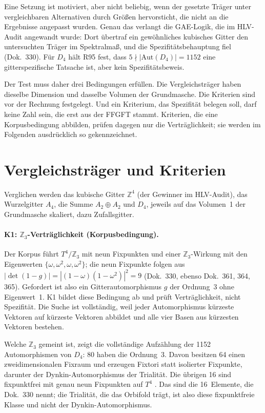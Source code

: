 Eine Setzung ist motiviert, aber nicht beliebig, wenn der gesetzte Träger
unter vergleichbaren Alternativen durch Größen hervorsticht, die nicht an die
Ergebnisse angepasst wurden. Genau das verlangt die GAE-Logik, die im
HLV-Audit angewandt wurde: Dort übertraf ein gewöhnliches kubisches Gitter den
untersuchten Träger im Spektralmaß, und die Spezifitätsbehauptung fiel
(Dok.~330). Für $D_4$ hält R95 fest, dass $5\nmid|\mathrm{Aut}(D_4)|=1152$
eine gitterspezifische Tatsache ist, aber kein Spezifitätsbeweis.

Der Test muss daher drei Bedingungen erfüllen. Die Vergleichsträger haben
dieselbe Dimension und dasselbe Volumen der Grundmasche. Die Kriterien sind
vor der Rechnung festgelegt. Und ein Kriterium, das Spezifität belegen soll,
darf keine Zahl sein, die erst aus der FFGFT stammt. Kriterien, die eine
Korpusbedingung abbilden, prüfen dagegen nur die Verträglichkeit; sie werden
im Folgenden ausdrücklich so gekennzeichnet.

\section{Vergleichsträger und Kriterien}

Verglichen werden das kubische Gitter $\mathbb{Z}^4$ (der Gewinner im
HLV-Audit), das Wurzelgitter $A_4$, die Summe $A_2\oplus A_2$ und $D_4$,
jeweils auf das Volumen~1 der Grundmasche skaliert, dazu Zufallsgitter.

\paragraph{K1: $\mathbb{Z}_3$-Verträglichkeit (Korpusbedingung).}
Der Korpus führt $T^4/\mathbb{Z}_3$ mit neun Fixpunkten und einer
$\mathbb{Z}_3$-Wirkung mit den Eigenwerten $\{\omega,\omega^2,\omega,\omega^2\}$;
die neun Fixpunkte folgen aus $|\det(1-g)|=|(1-\omega)(1-\omega^2)|^2=9$
(Dok.~330, ebenso Dok.~361, 364, 365). Gefordert ist also ein
Gitterautomorphismus $g$ der Ordnung~3 ohne Eigenwert~1. K1 bildet diese
Bedingung ab und prüft Verträglichkeit, nicht Spezifität. Die Suche ist
vollständig, weil jeder Automorphismus kürzeste Vektoren auf kürzeste
Vektoren abbildet und alle vier Basen aus kürzesten Vektoren bestehen.

Welche $\mathbb{Z}_3$ gemeint ist, zeigt die vollständige Aufzählung der 1152
Automorphismen von $D_4$: 80 haben die Ordnung~3. Davon besitzen 64 einen
zweidimensionalen Fixraum und erzeugen Fixtori statt isolierter Fixpunkte,
darunter der Dynkin-Automorphismus der Trialität. Die übrigen 16 sind
fixpunktfrei mit genau neun Fixpunkten auf $T^4$ \KM. Das sind die
16~Elemente, die Dok.~330 nennt; die Trialität, die das Orbifold trägt, ist
also diese fixpunktfreie Klasse und nicht der Dynkin-Automorphismus.

